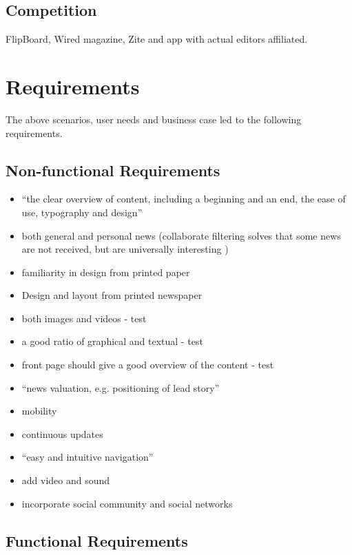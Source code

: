 \subsection{Competition}
FlipBoard, Wired magazine, Zite and app with actual editors affiliated.

\section{Requirements}
The above scenarios, user needs and business case led to the following requirements.

\subsection{Non-functional Requirements}
\begin{itemize}
	\item ``the clear overview of content, including a beginning and an end, the ease of use, typography and design'' \cite[p. 7]{FULLTEXT01.pdf}
	\item both general and personal news (collaborate filtering solves that some news are not received, but are universally interesting \cite{fulltext.pdf})
	\item familiarity in design from printed paper \cite[p. 7]{FULLTEXT01.pdf}
	\item Design and layout from printed newspaper \cite{hcii2005_1004.pdf}
	\item both images and videos - test
	\item a good ratio of graphical and textual - test
	\item front page should give a good overview of the content - test
	\item ``news valuation, e.g. positioning of lead story'' \cite[p. 7]{FULLTEXT01.pdf}
	\item  mobility \cite[p. 7]{FULLTEXT01.pdf}
	\item  continuous updates \cite[p. 7]{FULLTEXT01.pdf}
	\item ``easy and intuitive navigation'' \cite[p. 7]{FULLTEXT01.pdf}
	\item add video and sound \cite[p. 7]{FULLTEXT01.pdf}
	\item incorporate social community and social networks
\end{itemize}

\subsection{Functional Requirements}
